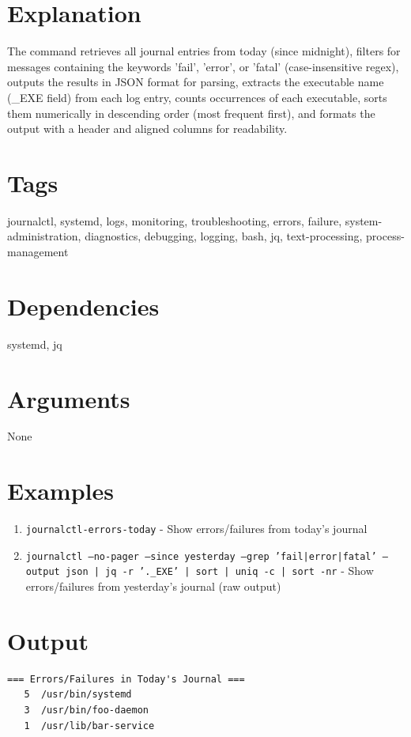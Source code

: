\documentclass[openany]{book}
\begin{document}
\section*{Explanation}
The command retrieves all journal entries from today (since midnight), filters for messages containing the keywords 'fail', 'error', or 'fatal' (case-insensitive regex), outputs the results in JSON format for parsing, extracts the executable name (\_EXE field) from each log entry, counts occurrences of each executable, sorts them numerically in descending order (most frequent first), and formats the output with a header and aligned columns for readability.

\section*{Tags}
journalctl, systemd, logs, monitoring, troubleshooting, errors, failure, system-administration, diagnostics, debugging, logging, bash, jq, text-processing, process-management

\section*{Dependencies}
systemd, jq


\section*{Arguments}
None

\section*{Examples}
\begin{enumerate}
  \item \texttt{journalctl-errors-today} - Show errors/failures from today's journal
  \item \texttt{journalctl --no-pager --since yesterday --grep 'fail|error|fatal' --output json | jq -r '.\_EXE' | sort | uniq -c | sort -nr} - Show errors/failures from yesterday's journal (raw output)
\end{enumerate}

\section*{Output}
\begin{lstlisting}
=== Errors/Failures in Today's Journal ===
   5  /usr/bin/systemd
   3  /usr/bin/foo-daemon
   1  /usr/lib/bar-service
\end{lstlisting}
\end{document}
